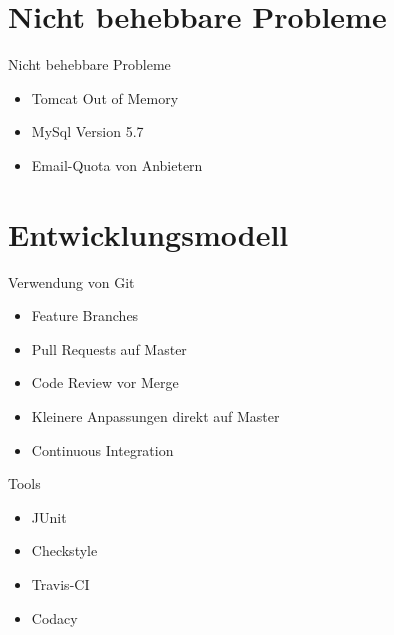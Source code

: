 \documentclass[xcolor=dvipsnames]{beamer}
\begin{document}
\section{Nicht behebbare Probleme}
\begin{frame}{Nicht behebbare Probleme}
\begin{itemize}
    \item Tomcat Out of Memory
    \item MySql Version 5.7
    \item Email-Quota von Anbietern
\end{itemize}
\end{frame}

\section{Entwicklungsmodell}
\begin{frame}{Verwendung von Git}
    \begin{itemize}
        \item Feature Branches
        \item Pull Requests auf Master
        \item Code Review vor Merge
        \item Kleinere Anpassungen direkt auf Master
        \item Continuous Integration
    \end{itemize}
\end{frame}

\begin{frame}{Tools}
    \begin{itemize}
        \item JUnit
        \item Checkstyle
        \item Travis-CI
        \item Codacy
    \end{itemize}
\end{frame}
\end{document}
